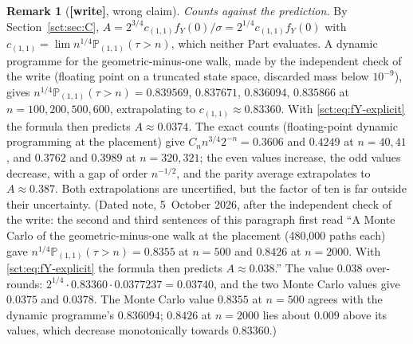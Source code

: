 \documentclass[11pt,letterpaper]{article}
\theoremstyle{definition}\newtheorem{remark}[theorem]{Remark}
\newcommand{\Pp}{\mathbb P}\newcommand{\Ee}{\mathbb E}
\newcommand{\fY}{f_Y}\newcommand{\code}[1]{\texttt{#1}}
\newcommand{\wtag}{\textup{\textbf{[write]}}}
\begin{document}
\begin{remark}[\wtag, wrong claim]
\emph{Counts against the prediction.} By Section~\ref{sct:sec:C}, $A=2^{3/4}c_{(1,1)}\fY(0)/\sigma=2^{1/4}c_{(1,1)}\fY(0)$ with $c_{(1,1)}=\lim n^{1/4}\Pp_{(1,1)}(\tau>n)$, which neither Part evaluates. A dynamic programme for the geometric-minus-one walk, made by the independent check of the write (floating point on a truncated state space, discarded mass below $10^{-9}$), gives $n^{1/4}\Pp_{(1,1)}(\tau>n)=0.839569$, $0.837671$, $0.836094$, $0.835866$ at $n=100,200,500,600$, extrapolating to $c_{(1,1)}\approx0.83360$. With \eqref{sct:eq:fY-explicit} the formula then predicts $A\approx0.0374$. The exact counts (floating-point dynamic programming at the placement) give $C_nn^{3/4}2^{-n}=0.3606$ and $0.4249$ at $n=40,41$, and $0.3762$ and $0.3989$ at $n=320,321$; the even values increase, the odd values decrease, with a gap of order $n^{-1/2}$, and the parity average extrapolates to $A\approx0.387$. Both extrapolations are uncertified, but the factor of ten is far outside their uncertainty. (Dated note, 5~October 2026, after the independent check of the write: the second and third sentences of this paragraph first read ``A Monte Carlo of the geometric-minus-one walk at the placement (480{,}000 paths each) gave $n^{1/4}\Pp_{(1,1)}(\tau>n)=0.8355$ at $n=500$ and $0.8426$ at $n=2000$. With \eqref{sct:eq:fY-explicit} the formula then predicts $A\approx0.038$.'' The value $0.038$ over-rounds: $2^{1/4}\cdot0.83360\cdot0.0377237=0.03740$, and the two Monte Carlo values give $0.0375$ and $0.0378$. The Monte Carlo value $0.8355$ at $n=500$ agrees with the dynamic programme's $0.836094$; $0.8426$ at $n=2000$ lies about $0.009$ above its values, which decrease monotonically towards $0.83360$.)
\end{remark}
\end{document}
